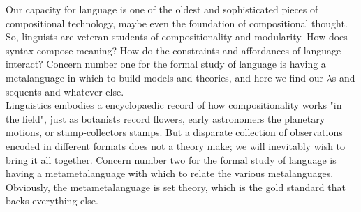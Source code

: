 \marginskip{1cm}


Our capacity for language is one of the oldest and sophisticated pieces of compositional technology, maybe even the foundation of compositional thought. So, linguists are veteran students of compositionality and modularity. How does syntax compose meaning? How do the constraints and affordances of language interact? Concern number one for the formal study of language is having a metalanguage in which to build models and theories, and here we find our $\lambda$s and sequents and whatever else.\\

Linguistics embodies a encyclopaedic record of how compositionality works "in the field", just as botanists record flowers, early astronomers the planetary motions, or stamp-collectors stamps. But a disparate collection of observations encoded in different formats does not a theory make; we will inevitably wish to bring it all together. Concern number two for the formal study of language is having a metametalanguage with which to relate the various metalanguages. Obviously, the metametalanguage is set theory, which is the gold standard that backs everything else.\\


